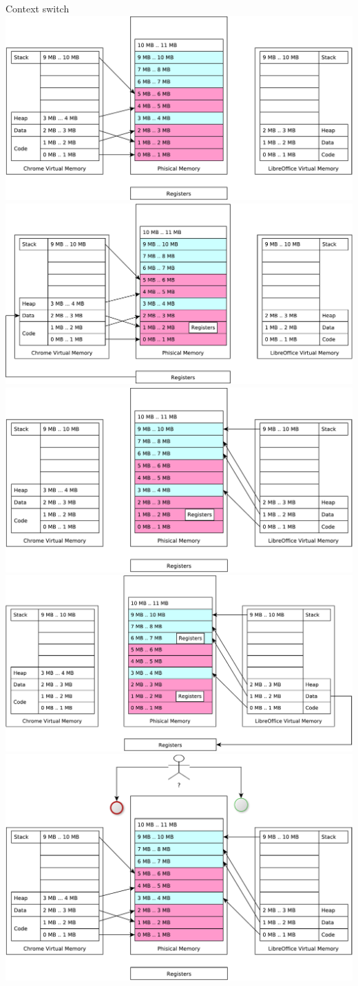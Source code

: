 \documentclass{beamer}
\begin{document}
\begin{frame}{Context switch}
     {
  \includegraphics[width=0.7\linewidth]{ctx1}
}
     {
  \includegraphics[width=0.7\linewidth]{ctx2}
}
     {
  \includegraphics[width=0.7\linewidth]{ctx3}
}
     {
  \includegraphics[width=0.7\linewidth]{ctx4}
}
     {
  \includegraphics[width=0.7\linewidth]{ctx5}
}
\end{frame}
\end{document}
